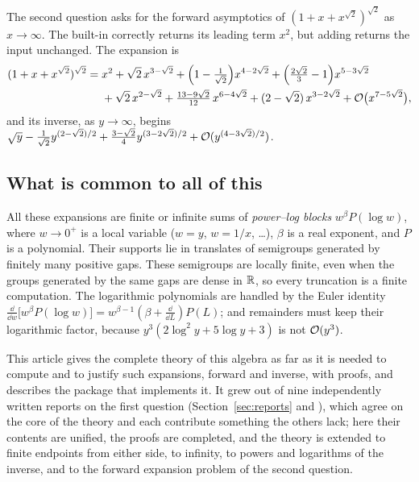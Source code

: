 The second question \cite{q2} asks for the forward asymptotics of $(1+x+x^{\sqrt2})^{\sqrt2}$ as $x\to\infty$. The built-in  correctly returns its leading term $x^2$, but adding  returns the input unchanged. The expansion is
\begin{equation}
\begin{aligned}
 (1+x+x^{\sqrt2})^{\sqrt2}={}&x^2+\sqrt2\,x^{3-\sqrt2}+\Bigl(1-\tfrac1{\sqrt2}\Bigr)x^{4-2\sqrt2}+\Bigl(\tfrac{2\sqrt2}{3}-1\Bigr)x^{5-3\sqrt2}\\
 &+\sqrt2\,x^{2-\sqrt2}+\tfrac{13-9\sqrt2}{12}\,x^{6-4\sqrt2}+(2-\sqrt2)\,x^{3-2\sqrt2}+\mathcal O\bigl(x^{7-5\sqrt2}\bigr),
\end{aligned}
 \label{eq:answer3}
\end{equation}
and its inverse, as $y\to\infty$, begins $\sqrt y-\tfrac1{\sqrt2}y^{(2-\sqrt2)/2}+\tfrac{3-\sqrt2}{4}y^{(3-2\sqrt2)/2}+\mathcal O(y^{(4-3\sqrt2)/2})$.

\subsection{What is common to all of this}

All these expansions are finite or infinite sums of \emph{power--log blocks} $w^\beta P(\log w)$, where $w\to0^+$ is a local variable ($w=y$, $w=1/x$, \dots), $\beta$ is a real exponent, and $P$ is a polynomial. Their supports lie in translates of semigroups generated by finitely many positive gaps. These semigroups are locally finite, even when the groups generated by the same gaps are dense in $\mathbb R$, so every truncation is a finite computation. The logarithmic polynomials are handled by the Euler identity $\frac{\dd}{\dd w}\bigl[w^\beta P(\log w)\bigr]=w^{\beta-1}(\beta+\tfrac{\dd}{\dd L})P(L)$; and remainders must keep their logarithmic factor, because $y^3(2\log^2y+5\log y+3)$ is not $\mathcal O(y^3)$.

This article gives the complete theory of this algebra as far as it is needed to compute and to justify such expansions, forward and inverse, with proofs, and describes the package  that implements it. It grew out of nine independently written reports on the first question (Section~\ref{sec:reports} and \cite{reports}), which agree on the core of the theory and each contribute something the others lack; here their contents are unified, the proofs are completed, and the theory is extended to finite endpoints from either side, to infinity, to powers and logarithms of the inverse, and to the forward expansion problem of the second question.

